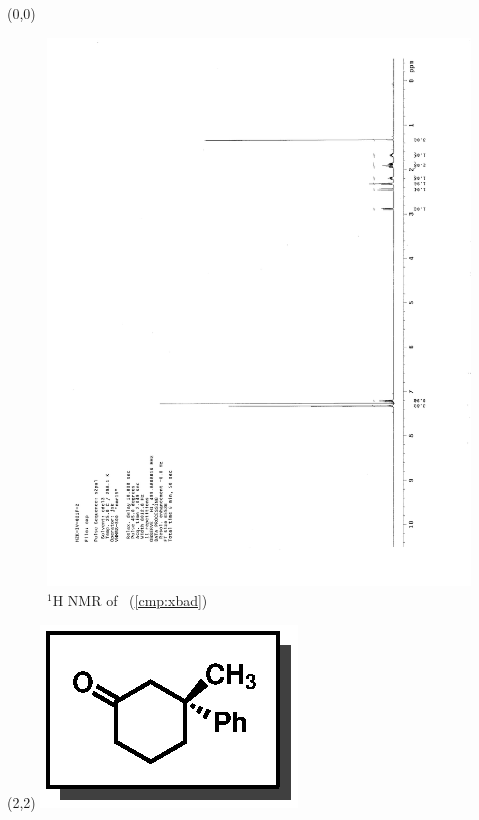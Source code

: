 \begin{textblock}{20}(0,0)
\begin{figure}[htb]
\caption{$^1$H NMR of \CMPxbad\ (\ref{cmp:xbad})}
\includegraphics[scale=0.75, trim = 0mm 0mm 0mm 5mm,
clip]{chp_singlecarbon/images/nmr/xbadH}
\vspace{-100pt}
\end{figure}
\end{textblock}
\begin{textblock}{1}(2,2)
\includegraphics[scale=0.8, angle=90]{chp_singlecarbon/images/xbad}
\end{textblock}
